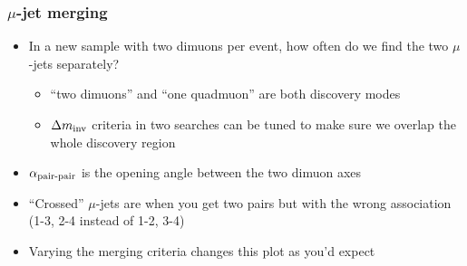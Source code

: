 \documentclass[compress]{beamer}
\begin{document}
\begin{frame}
\frametitle{$\mu$-jet merging}

\begin{itemize}
\item In a new sample with two dimuons per event, how often do we find
  the two $\mu$-jets separately?
\begin{itemize}
\item ``two dimuons'' and ``one quadmuon'' are both discovery modes
\item $\Delta m_{\mbox{\scriptsize inv}}$ criteria in two searches can
  be tuned to make sure we overlap the whole discovery region
\end{itemize}
\item $\alpha_{\mbox{\scriptsize pair-pair}}$ is the opening angle between the two dimuon axes
\item ``Crossed'' $\mu$-jets are when you get two pairs but with the wrong association (1-3, 2-4 instead of 1-2, 3-4)
\item Varying the merging criteria changes this plot as you'd expect
\end{itemize}


\end{frame}
\end{document}
